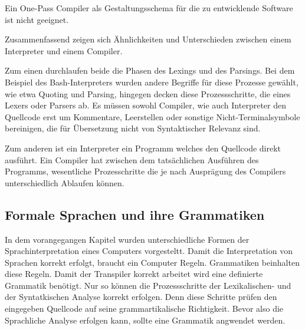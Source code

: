   Ein One-Pass Compiler als Gestaltungsschema für die zu entwicklende Software ist nicht geeignet.
  
Zusammenfassend zeigen sich Ähnlichkeiten und Unterschieden zwischen einem Interpreter und einem Compiler. 

Zum einen durchlaufen beide die Phasen des Lexings und des Parsings. Bei dem Beispiel des Bash-Interpreters wurden andere Begriffe für diese Prozesse gewählt, wie etwa Quoting und Parsing, hingegen decken diese Prozessschritte, die eines Lexers oder Parsers ab. Es müssen sowohl Compiler, wie auch Interpreter den Quellcode erst um Kommentare, Leerstellen oder sonstige Nicht-Terminalsymbole bereinigen, die für Übersetzung nicht von Syntaktischer Relevanz sind. 

Zum anderen ist ein Interpreter ein Programm welches den Quellcode direkt ausführt. Ein Compiler hat zwischen dem tatsächlichen Ausführen des Programms, wesentliche Prozesschritte die je nach Ausprägung des Compilers unterschiedlich Ablaufen können.


   \pagebreak
   
   
	\subsection{Formale Sprachen und ihre Grammatiken}
	In dem vorangegangen Kapitel wurden unterschiedliche Formen der Sprachinterpretation eines Computers vorgesteltt. Damit die Interpretation von Sprachen korrekt erfolgt, braucht ein Computer Regeln. Grammatiken beinhalten diese Regeln. Damit der Transpiler korrekt arbeitet wird eine definierte Grammatik benötigt. Nur so können die Prozessschritte der Lexikalischen- und der Syntatkischen Analyse korrekt erfolgen. Denn diese Schritte prüfen den eingegeben Quellcode auf seine grammartikalische Richtigkeit. Bevor also die Sprachliche Analyse erfolgen kann, sollte eine Grammatik angwendet werden.
	
